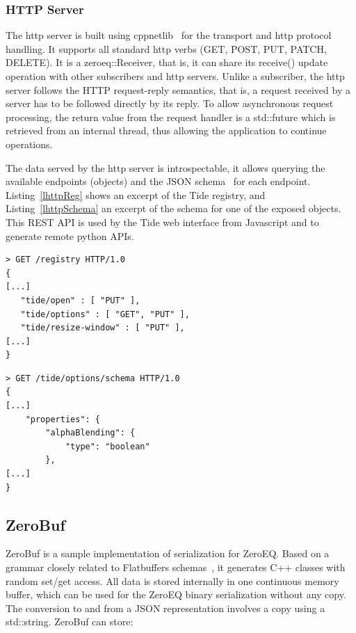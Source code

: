 \documentclass[10pt]{llncs}
\newcommand{\lref}[1]{Listing~\ref{#1}}
\begin{document}
\subsubsection{HTTP Server}

The http server is built using cppnetlib~\cite{cppnetlib} for the transport and
http protocol handling. It supports all standard http verbs (GET, POST, PUT,
PATCH, DELETE). It is a \textsf{zeroeq::Receiver}, that is, it can share its
\textsf{receive()} update operation with other subscribers and http servers.
Unlike a subscriber, the http server follows the HTTP request-reply semantics,
that is, a request received by a server has to be followed directly by its
reply. To allow asynchronous request processing, the return value from the
request handler is a \textsf{std::future} which is retrieved from an internal
thread, thus allowing the application to continue operations.

The data served by the http server is introspectable, it allows querying the
available endpoints (objects) and the JSON schema~\cite{jsonschema} for each
endpoint. \lref{lhttpReg} shows an excerpt of the Tide registry, and
\lref{lhttpSchema} an excerpt of the schema for one of the exposed objects. This
REST API is used by the Tide web interface from Javascript and to generate
remote python APIs.

\noindent\begin{minipage}[b][][b]{.48\textwidth}
\begin{lstlisting}[caption=HTTP Server Registry, label=lhttpReg]
> GET /registry HTTP/1.0
{
[...]
   "tide/open" : [ "PUT" ],
   "tide/options" : [ "GET", "PUT" ],
   "tide/resize-window" : [ "PUT" ],
[...]
}
\end{lstlisting}
\end{minipage}\hfill
\begin{minipage}[b][][b]{.48\textwidth}
\begin{lstlisting}[caption=Object JSON Schema, label=lhttpSchema]
> GET /tide/options/schema HTTP/1.0
{
[...]
    "properties": {
        "alphaBlending": {
            "type": "boolean"
        },
[...]
}
\end{lstlisting}
\end{minipage}

\subsection{ZeroBuf}

ZeroBuf is a sample implementation of serialization for ZeroEQ. Based on a
grammar closely related to Flatbuffers schemas~\cite{flatbuffers}, it generates
C++ classes with random \textsf{set/get} access. All data is stored internally
in one continuous memory buffer, which can be used for the ZeroEQ binary
serialization without any copy. The conversion to and from a JSON representation
involves a copy using a \textsf{std::string}. ZeroBuf can store:
\end{document}
